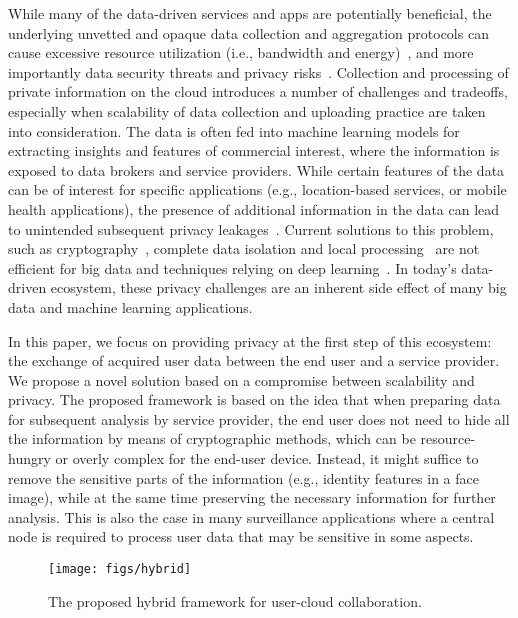 \documentclass[10pt,journal,compsoc]{IEEEtran}
\begin{document}
While many of the data-driven services and apps are potentially beneficial, the underlying unvetted and opaque data collection and aggregation protocols can cause excessive resource utilization (i.e., bandwidth and energy)~\cite{vallina2012breaking}, and more importantly data security threats and privacy risks~\cite{acquisti2015privacy}. Collection and processing of private information on the cloud introduces a number of challenges and tradeoffs, especially when scalability of data collection and uploading practice are taken into consideration. The data is often fed into machine learning models for extracting insights and features of commercial interest, where the information is exposed to data brokers and service providers. While certain features of the data can be of interest for specific applications (e.g., location-based services, or mobile health applications), the presence of additional information in the data can lead to unintended subsequent privacy leakages~\cite{haris2014privacy, haddadi2014quantified}. Current solutions to this problem, such as cryptography~\cite{garcia2010privacy, fontaine2007survey}, complete data isolation and local processing~\cite{garcia2015edge} are not efficient for big data and techniques relying on deep learning~\cite{osia2017}. In today's data-driven ecosystem, these privacy challenges are an inherent side effect of many big data and machine learning applications.

  
In this paper, we focus on providing privacy at the first step of this ecosystem: the exchange of acquired user data between the end user and a service provider. We propose a novel solution based on a compromise between scalability and privacy. The proposed framework is based on the idea that when preparing data for subsequent analysis by service provider, the end user does not need to hide all the information by means of cryptographic methods, which can be resource-hungry or overly complex for the end-user device. Instead, it might suffice to remove the sensitive parts of the information (e.g., identity features in a face image), while at the same time preserving the necessary information for further analysis. This is also the case in many surveillance applications where a central node is required to process user data that may be sensitive in some aspects. 

\begin{figure}[t!]	
	\centering
	\texttt{[image: figs/hybrid]}
	\caption{The proposed hybrid framework for user-cloud collaboration.}
	\label{fig:hybrid}
\end{figure}
\end{document}
